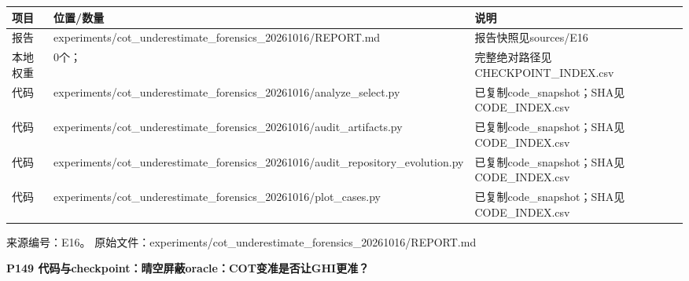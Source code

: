 \documentclass[UTF8,a4paper,landscape,10pt]{ctexart}
\begin{document}
\begin{center}\small
\begin{adjustbox}{max totalheight=0.58\textheight,max width=\linewidth}
\begin{minipage}{\linewidth}\begin{tabularx}{\linewidth}{>{\hsize=0.3500\hsize\raggedright\arraybackslash}X>{\hsize=1.9000\hsize\raggedright\arraybackslash}X>{\hsize=0.7500\hsize\raggedright\arraybackslash}X}\toprule
\textbf{项目} & \textbf{位置/\allowbreak{}数量} & \textbf{说明} \\ \midrule
报告 & experiments/\allowbreak{}cot\_\allowbreak{}underestimate\_\allowbreak{}forensics\_\allowbreak{}20261016/\allowbreak{}REPORT.md & 报告快照见sources/\allowbreak{}E16 \\
本地权重 & 0个； & 完整绝对路径见CHECKPOINT\_\allowbreak{}INDEX.csv \\
代码 & experiments/\allowbreak{}cot\_\allowbreak{}underestimate\_\allowbreak{}forensics\_\allowbreak{}20261016/\allowbreak{}analyze\_\allowbreak{}select.py & 已复制code\_\allowbreak{}snapshot；SHA见CODE\_\allowbreak{}INDEX.csv \\
代码 & experiments/\allowbreak{}cot\_\allowbreak{}underestimate\_\allowbreak{}forensics\_\allowbreak{}20261016/\allowbreak{}audit\_\allowbreak{}artifacts.py & 已复制code\_\allowbreak{}snapshot；SHA见CODE\_\allowbreak{}INDEX.csv \\
代码 & experiments/\allowbreak{}cot\_\allowbreak{}underestimate\_\allowbreak{}forensics\_\allowbreak{}20261016/\allowbreak{}audit\_\allowbreak{}repository\_\allowbreak{}evolution.py & 已复制code\_\allowbreak{}snapshot；SHA见CODE\_\allowbreak{}INDEX.csv \\
代码 & experiments/\allowbreak{}cot\_\allowbreak{}underestimate\_\allowbreak{}forensics\_\allowbreak{}20261016/\allowbreak{}plot\_\allowbreak{}cases.py & 已复制code\_\allowbreak{}snapshot；SHA见CODE\_\allowbreak{}INDEX.csv \\
\bottomrule\end{tabularx}\end{minipage}\end{adjustbox}\end{center}
\vfill{\scriptsize\color{muted} 来源编号：E16。 原始文件：experiments/\allowbreak{}cot\_\allowbreak{}underestimate\_\allowbreak{}forensics\_\allowbreak{}20261016/\allowbreak{}REPORT.md}\par
\clearpage
{\large\bfseries\color{ink} P149  代码与checkpoint：晴空屏蔽oracle：COT变准是否让GHI更准？}\par
\end{document}

